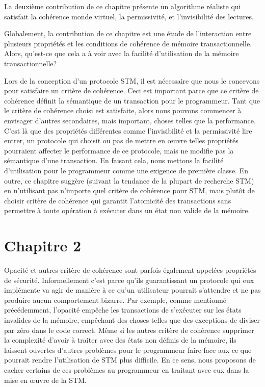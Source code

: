 La deuxième contribution de ce chapitre présente un algorithme réaliste qui satisfait la cohérence monde virtuel, la permissivité, et l'invisibilité des lectures.

Globalement, la contribution de ce chapitre est une étude de l'interaction entre plusieurs propriétés et les conditions de cohérence de mémoire transactionnelle.
Alors, qu'est-ce que cela a à voir avec la facilité d'utilisation de la mémoire transactionnelle?




Lors de la conception d'un protocole STM, il est nécessaire que nous le concevons pour satisfaire un critère de cohérence.
Ceci est important parce que ce critère de cohérence définit la sémantique de un transaction pour le programmeur.
Tant que le critère de cohérence choisi est satisfaite, alors nous pouvons commencer à envisager d'autres secondaires,
mais important, choses telles que la performance.
C'est là que des propriétés différentes comme l'invisibilité et la permissivité lire entrer,
un protocole qui choisit ou pas de mettre en œuvre telles propriétés pourraient affecter le performance de ce protocole, mais ne modifie pas la sémantique d'une transaction.
En faisant cela, nous mettons la facilité d'utilisation pour le programmeur comme une exigence de première classe.
En outre, ce chapitre suggère (suivant la tendance de la plupart de recherche STM) en n'utilisant pas n'importe quel critère de cohérence pour STM,
mais plutôt de choisir critère de cohérence qui garantit l'atomicité des transactions sans permettre à toute opération à exécuter dans un état non valide de la mémoire.




\section{Chapitre 2}

Opacité et autres critère de cohérence sont parfois également appelées propriétés de sécurité.
Informellement c'est parce qu'ils guarantissant un protocole qui eux implémente va
agir de manière à ce qu'un utilisateur pourrait s'attendre et ne pas produire aucun comportement bizarre.
Par exemple, comme mentionné précédemment, l'opacité empêche les transactions de s'exécuter sur les états invalides de la mémoire, empêchant
des choses telles que des exceptions de diviser par zéro dans le code correct.
Même si les autres critère de cohérence supprimer la complexité d'avoir à traiter avec des états non définis de la mémoire,
ils laissent ouvertes d'autres problèmes pour le programmeur faire face aux ce que pourrait rendre l'utilisation de STM plus difficile.
En ce sens, nous proposons de cacher certains de ces problèmes au programmeur en traitant avec eux dans la mise en œuvre de la STM.




